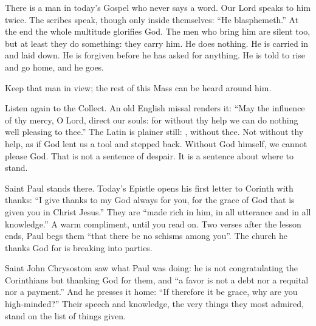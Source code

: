 \raggedcolumns

There is a man in today's Gospel who never says a word. Our Lord speaks to him
twice. The scribes speak, though only inside themselves: ``He blasphemeth.''
At the end the whole multitude glorifies God. The men who bring him are silent
too, but at least they do something: they carry him. He does nothing. He is
carried in and laid down. He is forgiven before he has asked for anything. He
is told to rise and go home, and he goes.

Keep that man in view; the rest of this Mass can be heard around him.

\bigskip

Listen again to the Collect. An old English missal renders it: ``May the
influence of thy mercy, O Lord, direct our souls: for without thy help we can
do nothing well pleasing to thee.'' The Latin is plainer still: , without thee. Not without thy help, as if God lent us a tool and stepped
back. Without God himself, we cannot please God. That is not a sentence of
despair. It is a sentence about where to stand.

Saint Paul stands there. Today's Epistle opens his first letter to Corinth
with thanks: ``I give thanks to my God always for you, for the grace of God
that is given you in Christ Jesus.'' They are ``made rich in him, in all
utterance and in all knowledge.'' A warm compliment, until you read on. Two
verses after the lesson ends, Paul begs them ``that there be no schisms among
you''. The church he thanks God for is breaking into parties.

Saint John Chrysostom saw what Paul was doing: he is not congratulating the
Corinthians but thanking God for them, and ``a favor is not a debt nor a
requital nor a payment.'' And he presses it home: ``If therefore it be grace,
why are you high-minded?'' Their speech and knowledge, the very things they
most admired, stand on the list of things given.

